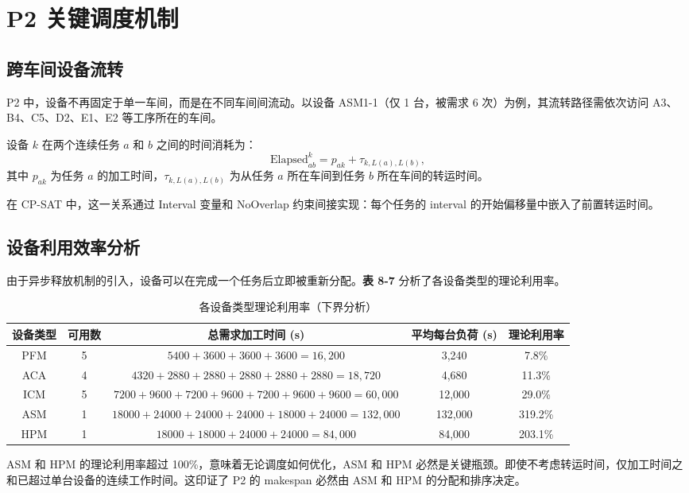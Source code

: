 \documentclass[UTF8,a4paper,12pt]{ctexart}
\begin{document}
\section{P2 关键调度机制}
\subsection{跨车间设备流转}
P2 中，设备不再固定于单一车间，而是在不同车间间流动。以设备 ASM1-1（仅 1 台，被需求 6 次）为例，其流转路径需依次访问 A3、B4、C5、D2、E1、E2 等工序所在的车间。

设备 $k$ 在两个连续任务 $a$ 和 $b$ 之间的时间消耗为：
\begin{equation}
\text{Elapsed}_{ab}^k = p_{ak} + \tau_{k, L(a), L(b)}, \tag{8-4}
\end{equation}
其中 $p_{ak}$ 为任务 $a$ 的加工时间，$\tau_{k, L(a), L(b)}$ 为从任务 $a$ 所在车间到任务 $b$ 所在车间的转运时间。

在 CP-SAT 中，这一关系通过 Interval 变量和 NoOverlap 约束间接实现：每个任务的 interval 的开始偏移量中嵌入了前置转运时间。

\subsection{设备利用效率分析}
由于异步释放机制的引入，设备可以在完成一个任务后立即被重新分配。\textbf{表 8-7} 分析了各设备类型的理论利用率。

\begin{table}[htbp]
  \centering
  \caption{各设备类型理论利用率（下界分析）}
  \label{tab:utilization}
  \begin{tabular}{ccccc}
    \toprule
    设备类型 & 可用数 & 总需求加工时间 (s) & 平均每台负荷 (s) & 理论利用率 \\
    \midrule
    PFM & 5 & $5400+3600+3600+3600 = 16,200$ & 3,240 & 7.8\% \\
    ACA & 4 & $4320+2880+2880+2880+2880+2880 = 18,720$ & 4,680 & 11.3\% \\
    ICM & 5 & $7200+9600+7200+9600+7200+9600+9600 = 60,000$ & 12,000 & 29.0\% \\
    ASM & 1 & $18000+24000+24000+24000+18000+24000 = 132,000$ & 132,000 & 319.2\% \\
    HPM & 1 & $18000+18000+24000+24000 = 84,000$ & 84,000 & 203.1\% \\
    \bottomrule
  \end{tabular}
\end{table}

ASM 和 HPM 的理论利用率超过 100\%，意味着无论调度如何优化，ASM 和 HPM 必然是关键瓶颈。即使不考虑转运时间，仅加工时间之和已超过单台设备的连续工作时间。这印证了 P2 的 makespan 必然由 ASM 和 HPM 的分配和排序决定。
\end{document}
